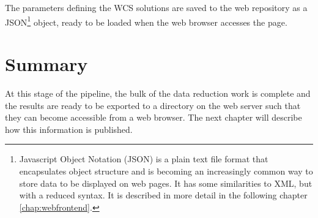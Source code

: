 The parameters defining the WCS solutions are saved to the web repository as a JSON\footnote{Javascript Object Notation (JSON) is a plain text file format that encapsulates object structure and is becoming an increasingly common way to store data to be displayed on web pages. It has some similarities to XML, but with a reduced syntax. It is described in more detail in the following chapter \ref{chap:webfrontend}.} object, ready to be loaded when the web browser accesses the page. 

\section{Summary}
At this stage of the pipeline, the bulk of the data reduction work is complete and the results are ready to be exported to a directory on the web server such that they can become accessible from a web browser. The next chapter will describe how this information is published.  
